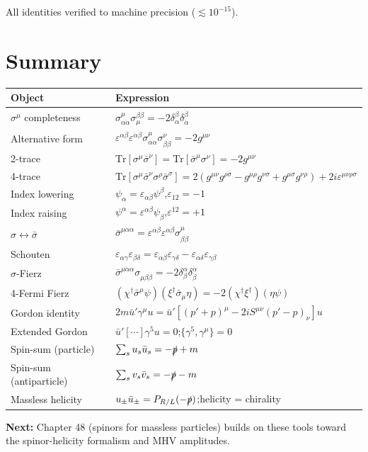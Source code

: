 All identities verified to machine precision ($\lesssim 10^{-15}$).

\section{Summary}

\begin{center}
\renewcommand{\arraystretch}{1.5}
\begin{tabular}{@{}ll@{}}
  \toprule
  Object & Expression \\
  \midrule
  $\sigma^\mu$ completeness & $\sigma^\mu_{\alpha\dot\alpha}\sigma_\mu^{\beta\dot\beta}=-2\delta_\alpha^\beta\delta_{\dot\alpha}^{\dot\beta}$ \\
  Alternative form & $\varepsilon^{\alpha\beta}\varepsilon^{\dot\alpha\dot\beta}\sigma^\mu_{\alpha\dot\alpha}\sigma^\nu_{\beta\dot\beta}=-2g^{\mu\nu}$ \\
  2-trace & $\mathrm{Tr}[\sigma^\mu\bar\sigma^\nu]=\mathrm{Tr}[\bar\sigma^\mu\sigma^\nu]=-2g^{\mu\nu}$ \\
  4-trace & $\mathrm{Tr}[\sigma^\mu\bar\sigma^\nu\sigma^\rho\bar\sigma^\sigma]=2(g^{\mu\nu}g^{\rho\sigma}-g^{\mu\rho}g^{\nu\sigma}+g^{\mu\sigma}g^{\nu\rho})+2i\varepsilon^{\mu\nu\rho\sigma}$ \\
  Index lowering & $\psi_\alpha=\varepsilon_{\alpha\beta}\psi^\beta$,\quad $\varepsilon_{12}=-1$ \\
  Index raising & $\psi^\alpha=\varepsilon^{\alpha\beta}\psi_\beta$,\quad $\varepsilon^{12}=+1$ \\
  $\sigma\leftrightarrow\bar\sigma$ & $\bar\sigma^{\mu\dot\alpha\alpha}=\varepsilon^{\alpha\beta}\varepsilon^{\dot\alpha\dot\beta}\sigma^\mu_{\beta\dot\beta}$ \\
  Schouten & $\varepsilon_{\alpha\gamma}\varepsilon_{\beta\delta}=\varepsilon_{\alpha\beta}\varepsilon_{\gamma\delta}-\varepsilon_{\alpha\delta}\varepsilon_{\gamma\beta}$ \\
  $\sigma$-Fierz & $\bar\sigma^{\mu\dot\alpha\alpha}\sigma_{\mu\beta\dot\beta}=-2\delta^\alpha_\beta\delta^{\dot\alpha}_{\dot\beta}$ \\
  4-Fermi Fierz & $(\chi^\dagger\bar\sigma^\mu\psi)(\xi^\dagger\bar\sigma_\mu\eta)=-2(\chi^\dagger\xi^\dagger)(\eta\psi)$ \\
  Gordon identity & $2m\bar u'\gamma^\mu u = \bar u'[(p'+p)^\mu - 2iS^{\mu\nu}(p'-p)_\nu]u$ \\
  Extended Gordon & $\bar u'[\cdots]\gamma^5 u = 0$;\quad $\{\gamma^5,\gamma^\mu\}=0$ \\
  Spin-sum (particle) & $\sum_s u_s\bar u_s = -\slashed{p}+m$ \\
  Spin-sum (antiparticle) & $\sum_s v_s\bar v_s = -\slashed{p}-m$ \\
  Massless helicity & $u_\pm\bar u_\pm = P_{R/L}(-\slashed{p})$;\quad helicity = chirality \\
  \bottomrule
\end{tabular}
\end{center}

\bigskip
\noindent\textbf{Next:} Chapter 48 (spinors for massless particles) builds
on these tools toward the spinor-helicity formalism and MHV amplitudes.
